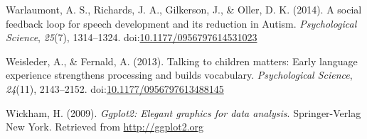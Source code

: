 \documentclass[,man,floatsintext]{apa6}
\begin{document}
\hypertarget{ref-warlaumont2014social}{}
Warlaumont, A. S., Richards, J. A., Gilkerson, J., \& Oller, D. K.
(2014). A social feedback loop for speech development and its reduction
in Autism. \emph{Psychological Science}, \emph{25}(7), 1314--1324.
doi:\href{https://doi.org/10.1177/0956797614531023}{10.1177/0956797614531023}

\hypertarget{ref-weisleder2013talking}{}
Weisleder, A., \& Fernald, A. (2013). Talking to children matters: Early
language experience strengthens processing and builds vocabulary.
\emph{Psychological Science}, \emph{24}(11), 2143--2152.
doi:\href{https://doi.org/10.1177/0956797613488145}{10.1177/0956797613488145}

\hypertarget{ref-R-ggplot2}{}
Wickham, H. (2009). \emph{Ggplot2: Elegant graphics for data analysis}.
Springer-Verlag New York. Retrieved from \url{http://ggplot2.org}

\endgroup
\end{document}
